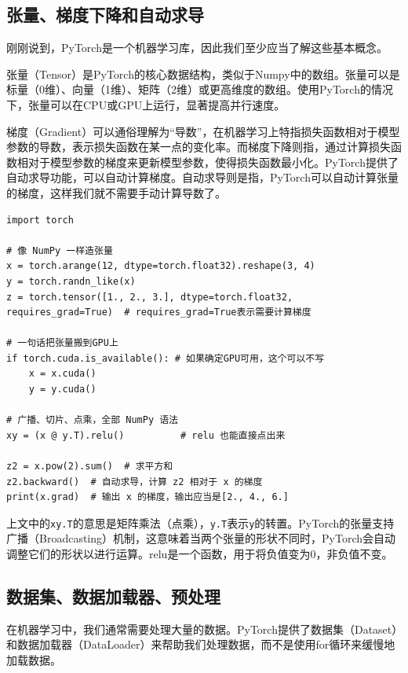\documentclass[../main.tex]{subfiles}
\begin{document}
\subsection{张量、梯度下降和自动求导}

刚刚说到，PyTorch是一个机器学习库，因此我们至少应当了解这些基本概念。

张量（Tensor）是PyTorch的核心数据结构，类似于Numpy中的数组。张量可以是标量（0维）、向量（1维）、矩阵（2维）或更高维度的数组。使用PyTorch的情况下，张量可以在CPU或GPU上运行，显著提高并行速度。

梯度（Gradient）可以通俗理解为“导数”，在机器学习上特指损失函数相对于模型参数的导数，表示损失函数在某一点的变化率。而梯度下降则指，通过计算损失函数相对于模型参数的梯度来更新模型参数，使得损失函数最小化。PyTorch提供了自动求导功能，可以自动计算梯度。自动求导则是指，PyTorch可以自动计算张量的梯度，这样我们就不需要手动计算导数了。

\begin{lstlisting}
import torch

# 像 NumPy 一样造张量
x = torch.arange(12, dtype=torch.float32).reshape(3, 4)
y = torch.randn_like(x)
z = torch.tensor([1., 2., 3.], dtype=torch.float32, requires_grad=True)  # requires_grad=True表示需要计算梯度

# 一句话把张量搬到GPU上
if torch.cuda.is_available(): # 如果确定GPU可用，这个可以不写
    x = x.cuda()
    y = y.cuda()

# 广播、切片、点乘，全部 NumPy 语法
xy = (x @ y.T).relu()          # relu 也能直接点出来

z2 = x.pow(2).sum()  # 求平方和
z2.backward()  # 自动求导，计算 z2 相对于 x 的梯度
print(x.grad)  # 输出 x 的梯度，输出应当是[2., 4., 6.]

\end{lstlisting}

上文中的\texttt{x\@ y.T}的意思是矩阵乘法（点乘），\texttt{y.T}表示\texttt{y}的转置。PyTorch的张量支持广播（Broadcasting）机制，这意味着当两个张量的形状不同时，PyTorch会自动调整它们的形状以进行运算。relu是一个函数，用于将负值变为0，非负值不变。

\subsection{数据集、数据加载器、预处理}

在机器学习中，我们通常需要处理大量的数据。PyTorch提供了数据集（Dataset）和数据加载器（DataLoader）来帮助我们处理数据，而不是使用for循环来缓慢地加载数据。
\end{document}
